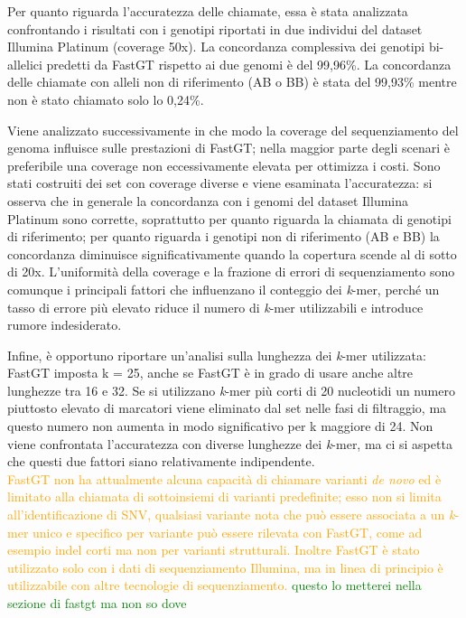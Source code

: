 \documentclass[../main.tex]{subfiles}
\begin{document}
Per quanto riguarda l'accuratezza delle chiamate, essa è stata analizzata confrontando i risultati con i genotipi riportati in due individui del dataset Illumina Platinum (coverage 50x). La concordanza complessiva dei genotipi bi-allelici predetti da FastGT rispetto ai due genomi è del 99,96\%. La concordanza delle chiamate con alleli non di riferimento (AB o BB) è stata del 99,93\% mentre non è stato chiamato solo lo 0,24\%.

Viene analizzato successivamente in che modo la coverage del sequenziamento del genoma influisce sulle prestazioni di FastGT; nella maggior parte degli scenari è preferibile una coverage non eccessivamente elevata per ottimizza i costi. Sono stati costruiti dei set con coverage diverse e viene esaminata l'accuratezza: si osserva che in generale la concordanza con i genomi del dataset Illumina Platinum sono corrette, soprattutto per quanto riguarda la chiamata di genotipi di riferimento; per quanto riguarda i genotipi non di riferimento (AB e BB) la concordanza diminuisce significativamente quando la copertura scende al di sotto di 20x. L'uniformità della coverage e la frazione di errori di sequenziamento sono comunque i principali fattori che influenzano il conteggio dei \textit{k}-mer, perché un tasso di errore più elevato riduce il numero di \textit{k}-mer utilizzabili e introduce rumore indesiderato. 

Infine, è opportuno riportare un'analisi sulla lunghezza dei \textit{k}-mer utilizzata: FastGT imposta k = 25, anche se FastGT è in grado di usare anche altre lunghezze tra 16 e 32. Se si utilizzano \textit{k}-mer più corti di 20 nucleotidi un numero piuttosto elevato di marcatori viene eliminato dal set nelle fasi di filtraggio, ma questo numero non aumenta in modo significativo per k maggiore di 24. Non viene confrontata l'accuratezza con diverse lunghezze dei \textit{k}-mer, ma ci si aspetta che questi due fattori siano relativamente indipendente. \\

\noindent
\textcolor{Orange}{FastGT non ha attualmente alcuna capacità di chiamare varianti \textit{de novo} ed è limitato alla chiamata di sottoinsiemi di varianti predefinite; esso non si limita all'identificazione di SNV, qualsiasi variante nota che può essere associata a un \textit{k}-mer unico e specifico per variante può essere rilevata con FastGT, come ad esempio indel corti ma non per varianti strutturali. Inoltre FastGT è stato utilizzato solo con i dati di sequenziamento Illumina, ma in linea di principio è utilizzabile con altre tecnologie di sequenziamento.} \textcolor{green}{questo lo metterei nella sezione di fastgt ma non so dove}
\end{document}
